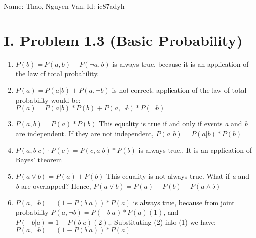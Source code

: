 \documentclass{article}
\begin{document}
Name: Thao, Nguyen Van.   Id: ic87adyh
\section*{\textbf{I. Problem 1.3 (Basic Probability)}}

\begin{enumerate}
  \item $P(b)=P(a,b)+P( \neg a,b)$ is always true, because it is an application of the law of total probability.
  \item $P(a)=P(a|b)+P(a,  \neg b)$ is not correct.   application of the law of total probability would be:  \\$P(a)=P(a|b) *P(b)+P(a,  \neg b)* P(\neg b)$ 
  \item $P(a, b)=P(a) * P(b)$ This equality is true if and only if events \textit{a} and \textit{b}  are independent. If they are not independent,  $P(a, b)=P(a|b) * P(b)$
  \item  $P(a,b|c)\cdot P(c)=P(c,a|b) * P(b)$ is always true,.  It is an application of Bayes’ theorem
  \item $P(a\lor b) = P(a) + P(b)$ 	This equality is not always true.  What if \textit{a} and \textit{b} are overlapped? Hence, $P(a\lor b) = P(a) + P(b) - P(a \land b)$
  \item  $P(a, \neg b) = (1 - P(b|a)) * P(a)$ is always true,  because  from joint probability  $P(a, \neg b) = P(-b|a) * P(a) (1)$,  and $P(-b|a) = 1 - P(b|a)  (2)$,. Substituting (2) into (1) we have:
     $P(a, \neg b) = (1 - P(b|a)) * P(a)$
\end{enumerate}
\end{document}
